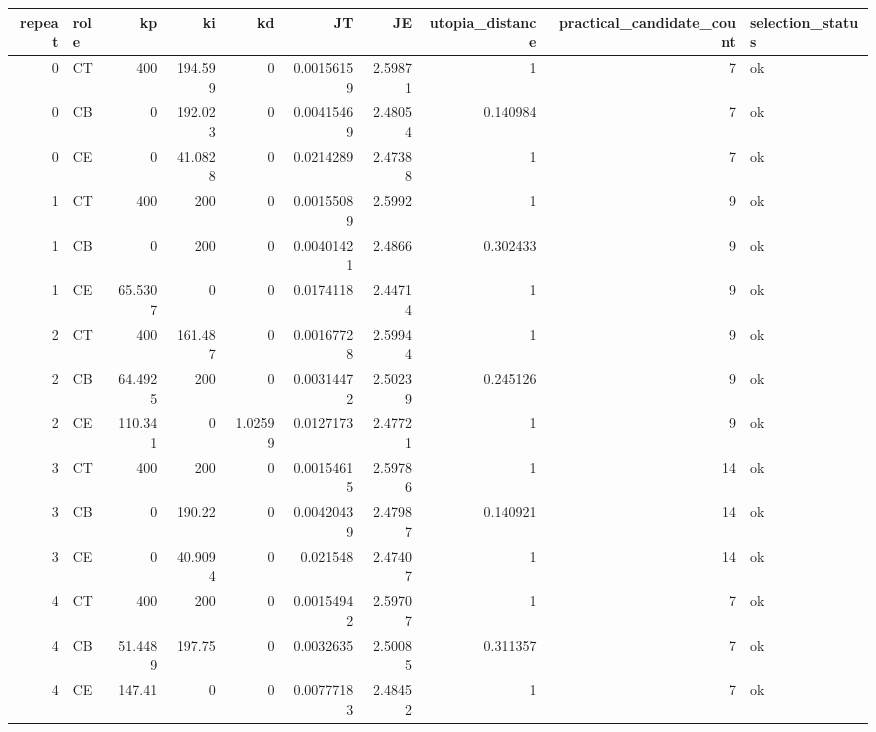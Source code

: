 \begin{tabular}{rlrrrrrrrl}
\toprule
repeat & role & kp & ki & kd & JT & JE & utopia\_distance & practical\_candidate\_count & selection\_status \\
\midrule
0 & CT & 400 & 194.599 & 0 & 0.00156159 & 2.59871 & 1 & 7 & ok \\
0 & CB & 0 & 192.023 & 0 & 0.00415469 & 2.48054 & 0.140984 & 7 & ok \\
0 & CE & 0 & 41.0828 & 0 & 0.0214289 & 2.47388 & 1 & 7 & ok \\
1 & CT & 400 & 200 & 0 & 0.00155089 & 2.5992 & 1 & 9 & ok \\
1 & CB & 0 & 200 & 0 & 0.00401421 & 2.4866 & 0.302433 & 9 & ok \\
1 & CE & 65.5307 & 0 & 0 & 0.0174118 & 2.44714 & 1 & 9 & ok \\
2 & CT & 400 & 161.487 & 0 & 0.00167728 & 2.59944 & 1 & 9 & ok \\
2 & CB & 64.4925 & 200 & 0 & 0.00314472 & 2.50239 & 0.245126 & 9 & ok \\
2 & CE & 110.341 & 0 & 1.02599 & 0.0127173 & 2.47721 & 1 & 9 & ok \\
3 & CT & 400 & 200 & 0 & 0.00154615 & 2.59786 & 1 & 14 & ok \\
3 & CB & 0 & 190.22 & 0 & 0.00420439 & 2.47987 & 0.140921 & 14 & ok \\
3 & CE & 0 & 40.9094 & 0 & 0.021548 & 2.47407 & 1 & 14 & ok \\
4 & CT & 400 & 200 & 0 & 0.00154942 & 2.59707 & 1 & 7 & ok \\
4 & CB & 51.4489 & 197.75 & 0 & 0.0032635 & 2.50085 & 0.311357 & 7 & ok \\
4 & CE & 147.41 & 0 & 0 & 0.00777183 & 2.48452 & 1 & 7 & ok \\
\bottomrule
\end{tabular}
